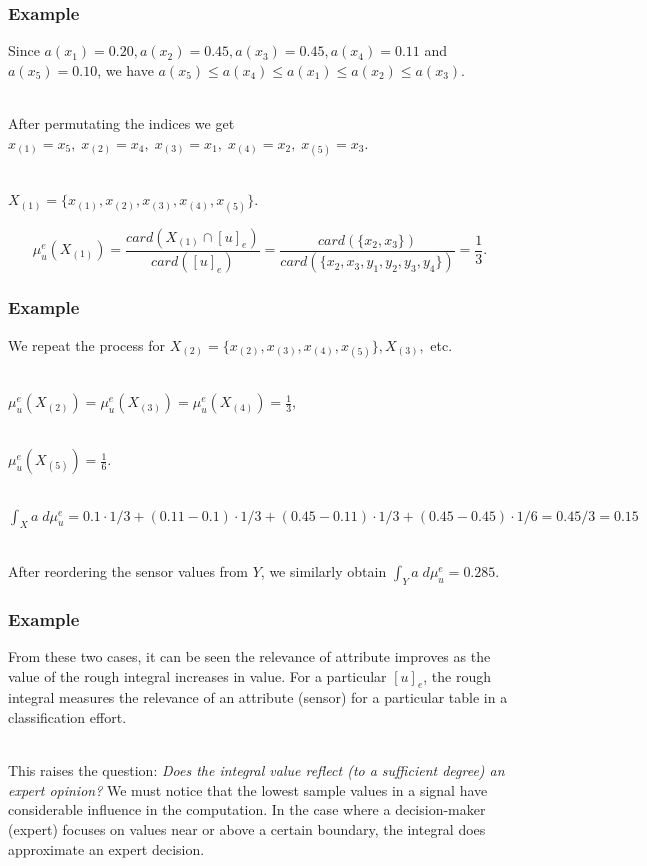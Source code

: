 \documentclass[envcountsect]{beamer}
\begin{document}
\begin{frame}
	\frametitle{Example}
	Since $a(x_1) = 0.20, a(x_2) = 0.45, a(x_3)=0.45, a(x_4) = 0.11$ and $a(x_5) = 0.10$, we have $a(x_5) \leq a(x_4) \leq a(x_1) \leq a(x_2) \leq a(x_3)$.\\ ~

	After permutating the indices we get $x_{(1)} = x_5, \; x_{(2)}= x_4, \; x_{(3)} = x_1, \; x_{(4)} = x_2, \;x_{(5)} = x_3$.  \\ ~


	$X_{(1)} = \{x_{(1)},x_{(2)},x_{(3)},x_{(4)},x_{(5)}\}. $  ~

	$$\mu_u^e(X_{(1)}) = \frac{card(X_{(1)}\cap[u]_e)}{card([u]_e)} = \frac{card(\{x_2,x_3\})}{card(\{x_2,x_3,y_1,y_2,y_3,y_4\})} = \frac{1}{3}.$$

	\end{frame}
	\begin{frame}
		\frametitle{Example}

		We repeat the process for $X_{(2)} = \{x_{(2)},x_{(3)},x_{(4)},x_{(5)}\}, X_{(3)},$ etc. \\ ~

	$\mu_u^e(X_{(2)}) = \mu_u^e(X_{(3)}) = \mu_u^e(X_{(4)}) = \frac{1}{3}$, \\ ~

	$\mu_u^e(X_{(5)}) = \frac{1}{6}.$\\~

	$\int_{X} a \;d\mu_u^e = 0.1\cdot1/3+(0.11-0.1) \cdot 1/3 + (0.45-0.11)\cdot 1/3 + (0.45-0.45)\cdot 1/6 = 0.45/3 = 0.15$ \\ ~
	
		After reordering the sensor values from $Y$, we similarly obtain $\int_{Y} a \; d\mu_u^e = 0.285.$ \\ 



\end{frame}

\begin{frame}
	\frametitle{Example}
	From these two cases, it can be seen the relevance of attribute improves as the value of the rough integral increases in value. For a particular $[u]_e$, the rough integral measures the relevance of an attribute (sensor) for a particular table in a classification effort. \\ ~

	This raises the question: \emph{Does the integral value reflect (to a sufficient degree) an expert opinion?} We must notice that the lowest sample values in a signal have considerable influence in the computation. In the case where a decision-maker (expert) focuses on values near or above a certain boundary, the integral does approximate an expert decision.
\end{frame}
\end{document}
